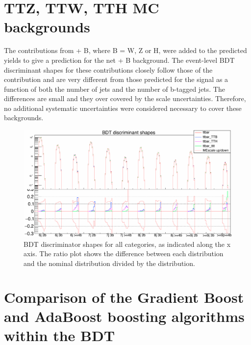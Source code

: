 \section{TTZ, TTW, TTH MC backgrounds~\label{app:TTX}}
The contributions from \ttbar + B, where B = W, Z or H, were added to the predicted \ttbar yields to give a prediction for the net \ttbar + B background. The event-level BDT discriminant shapes for these contributions closely follow those of the \ttbar contribution and are very different from those predicted for the \tttt signal as a function of both the number of jets and the number of b-tagged jets. The differences are small and they over covered by the \ttbar scale uncertainties. Therefore, no additional systematic uncertainties were considered necessary to cover these backgrounds.


\begin{figure}[ht]
\centering
    \includegraphics[width=\textwidth]{images/Run2/ttbarShapesLabels.png}
    \caption{BDT discriminator shapes for all categories, as indicated along the x axis. The ratio plot shows the difference between each distribution and the nominal \ttbar distribution divided by the \ttbar distribution.}
    \label{fig:TTB}
\end{figure}

\section{Comparison of the Gradient Boost and AdaBoost boosting algorithms within the BDT \label{app:gradBoost}}

